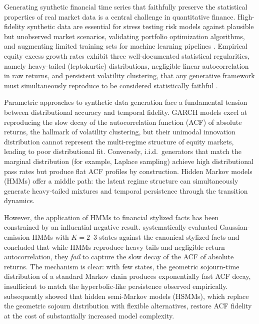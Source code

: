 Generating synthetic financial time series that faithfully preserve the statistical properties of real market data is a central challenge in quantitative finance.
High-fidelity synthetic data are essential for stress testing risk models against plausible but unobserved market scenarios, validating portfolio optimization algorithms, and augmenting limited training sets for machine learning pipelines \cite{assefa2020generating, jordon2022synthetic}.
Empirical equity excess growth rates exhibit three well-documented statistical regularities, namely heavy-tailed (leptokurtic) distributions, negligible linear autocorrelation in raw returns, and persistent volatility clustering, that any generative framework must simultaneously reproduce to be considered statistically faithful \cite{cont2001empirical, mandelbrot1963variation}.

Parametric approaches to synthetic data generation face a fundamental tension between distributional accuracy and temporal fidelity.
GARCH models \cite{engle1982autoregressive, bollerslev1986generalized} excel at reproducing the slow decay of the autocorrelation function (ACF) of absolute returns, the hallmark of volatility clustering, but their unimodal innovation distribution cannot represent the multi-regime structure of equity markets, leading to poor distributional fit.
Conversely, i.i.d.\ generators that match the marginal distribution (for example, Laplace sampling) achieve high distributional pass rates but produce flat ACF profiles by construction.
Hidden Markov models (HMMs) offer a middle path: the latent regime structure can simultaneously generate heavy-tailed mixtures and temporal persistence through the transition dynamics.

However, the application of HMMs to financial stylized facts has been constrained by an influential negative result.
\citet{ryden1998stylized} systematically evaluated Gaussian-emission HMMs with $K = 2$--$3$ states against the canonical stylized facts and concluded that while HMMs reproduce heavy tails and negligible return autocorrelation, they \emph{fail} to capture the slow decay of the ACF of absolute returns.
The mechanism is clear: with few states, the geometric sojourn-time distribution of a standard Markov chain produces exponentially fast ACF decay, insufficient to match the hyperbolic-like persistence observed empirically.
\citet{bulla2006stylized} subsequently showed that hidden semi-Markov models (HSMMs), which replace the geometric sojourn distribution with flexible alternatives, restore ACF fidelity at the cost of substantially increased model complexity.

